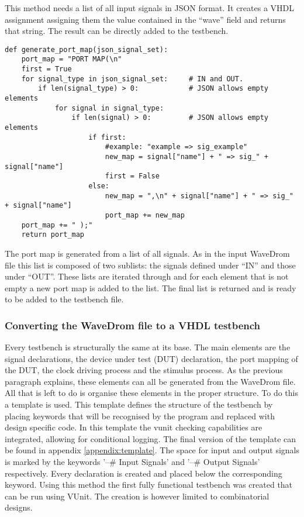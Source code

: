 This method needs a list of all input signals in JSON format. It creates a VHDL assignment assigning them the value contained in the “wave” field and returns that string. The result can be directly added to the testbench.\newpage
\begin{lstlisting}[style=python, caption={Generating a port map in Python}, label={
python:port_map}]
def generate_port_map(json_signal_set):
	port_map = "PORT MAP(\n"
	first = True
	for signal_type in json_signal_set:     # IN and OUT.
		if len(signal_type) > 0:            # JSON allows empty elements
			for signal in signal_type:
				if len(signal) > 0:         # JSON allows empty elements
					if first:
						#example: "example => sig_example"
						new_map = signal["name"] + " => sig_" + signal["name"]
						first = False
					else:
						new_map = ",\n" + signal["name"] + " => sig_" + signal["name"]
						port_map += new_map
	port_map += " );"
	return port_map
\end{lstlisting}\noindent
The port map is generated from a list of all signals. As in the input WaveDrom file this list is composed of two sublists: the signals defined under “IN” and those under “OUT”. These lists are iterated through and for each element that is not empty a new port map is added to the list. The final list is returned and is ready to be added to the testbench file.
\subsubsection{Converting the WaveDrom file to a VHDL testbench}
Every testbench is structurally the same at its base. The main elements are the signal declarations, the device under test (DUT) declaration, the port mapping of the DUT, the clock driving process and the stimulus process. As the previous paragraph explains, these elements can all be generated from the WaveDrom file. All that is left to do is organise these elements in the proper structure. To do this a template is used. This template defines the structure of the testbench by placing keywords that will be recognised by the program and replaced with design specific code. In this template the vunit checking capabilities are integrated, allowing for conditional logging. The final version of the template can be found in appendix \ref{appendix:template}.
\npar
The space for input and output signals is marked by the keywords '--\# Input Signals' and '--\# Output Signals' respectively. Every declaration is created and placed below the corresponding keyword. 
\npar
Using this method the first fully functional testbench was created that can be run using VUnit. The creation is however limited to combinatorial designs.
